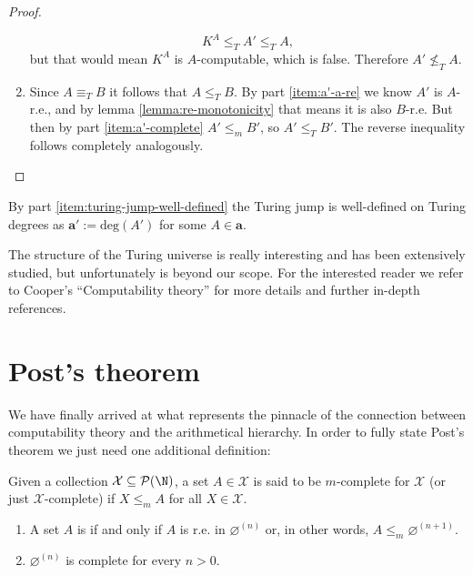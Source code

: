 \documentclass[../main.tex]{memoir}
\begin{document}
\begin{proof}
\begin{enumerate}
    \[ K^A \le_T A' \le_T A, \]
    but that would mean $K^A$ is $A$-computable, which is false. Therefore $A' \not\le_T A$.
  \item Since $A \equiv_T B$ it follows that $A \le_T B$. By part \ref{item:a'-a-re} we know $A'$ is $A$-r.e., and by lemma \ref{lemma:re-monotonicity} that means it is also $B$-r.e. But then by part \ref{item:a'-complete} $A' \le_m B'$, so $A' \le_T B'$. The reverse inequality follows completely analogously.
  \end{enumerate}
\end{proof}

\begin{corollary}
  By part \ref{item:turing-jump-well-defined} the Turing jump is well-defined on Turing degrees as $\mathbf{a}' := \text{deg}(A')$ for some $A \in \mathbf{a}$.
\end{corollary}

The structure of the Turing universe is really interesting and has been extensively studied, but unfortunately is beyond our scope. For the interested reader we refer to Cooper's ``Computability theory'' \cite{cooper} for more details and further in-depth references.

\section{Post's theorem}

We have finally arrived at what represents the pinnacle of the connection between computability theory and the arithmetical hierarchy. In order to fully state Post's theorem we just need one additional definition:

\begin{definition}[$m$-completeness]
  Given a collection $\mathcal{X} \subseteq \mathcal{P}(\N)$, a set $A \in \mathcal{X}$ is said to be $m$-complete for $\mathcal{X}$ (or just $\mathcal{X}$-complete) if $X \le_m A$ for all $X \in \mathcal{X}$.
\end{definition}

\begin{theorem}
  \begin{enumerate}
  \item A set $A$ is  if and only if $A$ is r.e. in $\varnothing^{(n)}$ or, in other words, $A \le_m \varnothing^{(n + 1)}$.
  \item $\varnothing^{(n)}$ is  complete for every $n > 0$.
  \end{enumerate}
\end{theorem}
\end{document}

